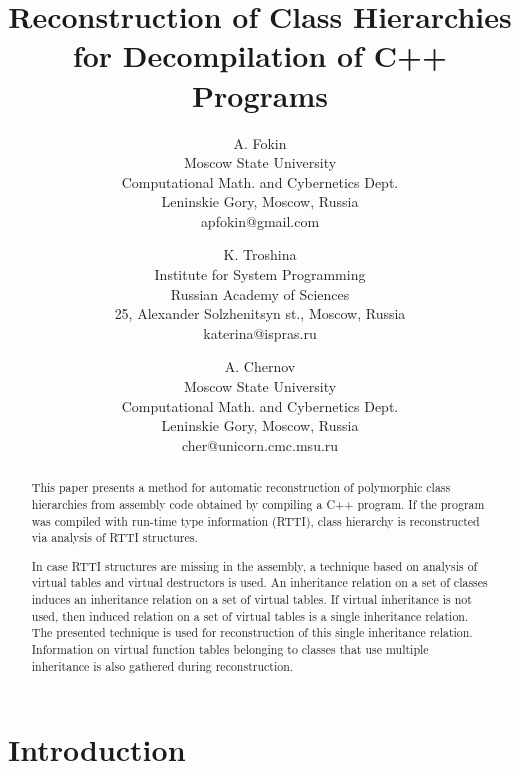 \documentclass[times, 10pt,twocolumn]{article}
\begin{document}
\title{Reconstruction of Class Hierarchies for Decompilation of C++ Programs}

\author{A. Fokin\\
Moscow State University\\
Computational Math. and Cybernetics Dept.\\
Leninskie Gory, Moscow, Russia\\
apfokin@gmail.com
\and
K. Troshina\\
Institute for System Programming\\
Russian Academy of Sciences\\
25, Alexander Solzhenitsyn st., Moscow, Russia\\
katerina@ispras.ru
\and
A. Chernov\\
Moscow State University\\
Computational Math. and Cybernetics Dept.\\
Leninskie Gory, Moscow, Russia\\
cher@unicorn.cmc.msu.ru
}

\maketitle
\thispagestyle{empty}

\begin{abstract}
This paper presents a method for automatic reconstruction of
polymorphic class hierarchies from assembly code obtained by
compiling a C++ program. If the program was compiled with
run-time type information (RTTI), class hierarchy is
reconstructed via analysis of RTTI structures.

In case RTTI structures are missing in the assembly,
a technique based on analysis
of virtual tables and virtual destructors is used.
An inheritance relation on a set of classes induces
an inheritance relation on a set of virtual tables.
If virtual inheritance is not used,
then induced relation on a set of virtual tables
is a single inheritance relation.
The presented technique is used for reconstruction
of this single inheritance relation.
Information on virtual function tables belonging to classes
that use multiple inheritance is also gathered during reconstruction.
\end{abstract}

\section{Introduction}
\end{document}
